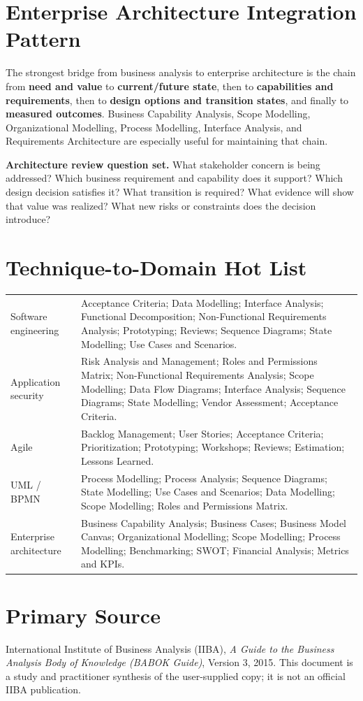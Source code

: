 \documentclass[11pt]{article}
\begin{document}
\section{Enterprise Architecture Integration Pattern}
The strongest bridge from business analysis to enterprise architecture is the chain from \textbf{need and value} to \textbf{current/future state}, then to \textbf{capabilities and requirements}, then to \textbf{design options and transition states}, and finally to \textbf{measured outcomes}. Business Capability Analysis, Scope Modelling, Organizational Modelling, Process Modelling, Interface Analysis, and Requirements Architecture are especially useful for maintaining that chain.

\begin{practicebox}
\textbf{Architecture review question set.} What stakeholder concern is being addressed? Which business requirement and capability does it support? Which design decision satisfies it? What transition is required? What evidence will show that value was realized? What new risks or constraints does the decision introduce?
\end{practicebox}
\section{Technique-to-Domain Hot List}
\begin{longtable}{L{0.22\textwidth} L{0.66\textwidth}}
\toprule
Software engineering & Acceptance Criteria; Data Modelling; Interface Analysis; Functional Decomposition; Non-Functional Requirements Analysis; Prototyping; Reviews; Sequence Diagrams; State Modelling; Use Cases and Scenarios.\\
Application security & Risk Analysis and Management; Roles and Permissions Matrix; Non-Functional Requirements Analysis; Scope Modelling; Data Flow Diagrams; Interface Analysis; Sequence Diagrams; State Modelling; Vendor Assessment; Acceptance Criteria.\\
Agile & Backlog Management; User Stories; Acceptance Criteria; Prioritization; Prototyping; Workshops; Reviews; Estimation; Lessons Learned.\\
UML / BPMN & Process Modelling; Process Analysis; Sequence Diagrams; State Modelling; Use Cases and Scenarios; Data Modelling; Scope Modelling; Roles and Permissions Matrix.\\
Enterprise architecture & Business Capability Analysis; Business Cases; Business Model Canvas; Organizational Modelling; Scope Modelling; Process Modelling; Benchmarking; SWOT; Financial Analysis; Metrics and KPIs.\\
\bottomrule
\end{longtable}

\section*{Primary Source}
International Institute of Business Analysis (IIBA), \emph{A Guide to the Business Analysis Body of Knowledge (BABOK Guide)}, Version 3, 2015. This document is a study and practitioner synthesis of the user-supplied copy; it is not an official IIBA publication.
\end{document}
